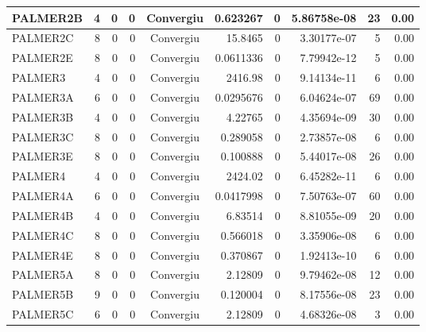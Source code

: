 \begin{center}
\begin{longtable}{|l|r|r|r|c|r|r|r|r|r|}
PALMER2B &      4 &      0 &      0 & Convergiu  &    0.623267 &              0 & 5.86758e-08 &     23 &    0.00 \\ \hline
PALMER2C &      8 &      0 &      0 & Convergiu  &     15.8465 &              0 & 3.30177e-07 &      5 &    0.00 \\ \hline
PALMER2E &      8 &      0 &      0 & Convergiu  &   0.0611336 &              0 & 7.79942e-12 &      5 &    0.00 \\ \hline
 PALMER3 &      4 &      0 &      0 & Convergiu  &     2416.98 &              0 & 9.14134e-11 &      6 &    0.00 \\ \hline
PALMER3A &      6 &      0 &      0 & Convergiu  &   0.0295676 &              0 & 6.04624e-07 &     69 &    0.00 \\ \hline
PALMER3B &      4 &      0 &      0 & Convergiu  &     4.22765 &              0 & 4.35694e-09 &     30 &    0.00 \\ \hline
PALMER3C &      8 &      0 &      0 & Convergiu  &    0.289058 &              0 & 2.73857e-08 &      6 &    0.00 \\ \hline
PALMER3E &      8 &      0 &      0 & Convergiu  &    0.100888 &              0 & 5.44017e-08 &     26 &    0.00 \\ \hline
 PALMER4 &      4 &      0 &      0 & Convergiu  &     2424.02 &              0 & 6.45282e-11 &      6 &    0.00 \\ \hline
PALMER4A &      6 &      0 &      0 & Convergiu  &   0.0417998 &              0 & 7.50763e-07 &     60 &    0.00 \\ \hline
PALMER4B &      4 &      0 &      0 & Convergiu  &     6.83514 &              0 & 8.81055e-09 &     20 &    0.00 \\ \hline
PALMER4C &      8 &      0 &      0 & Convergiu  &    0.566018 &              0 & 3.35906e-08 &      6 &    0.00 \\ \hline
PALMER4E &      8 &      0 &      0 & Convergiu  &    0.370867 &              0 & 1.92413e-10 &      6 &    0.00 \\ \hline
PALMER5A &      8 &      0 &      0 & Convergiu  &     2.12809 &              0 & 9.79462e-08 &     12 &    0.00 \\ \hline
PALMER5B &      9 &      0 &      0 & Convergiu  &    0.120004 &              0 & 8.17556e-08 &     23 &    0.00 \\ \hline
PALMER5C &      6 &      0 &      0 & Convergiu  &     2.12809 &              0 & 4.68326e-08 &      3 &    0.00 \\ \hline

\end{longtable}
\end{center}
